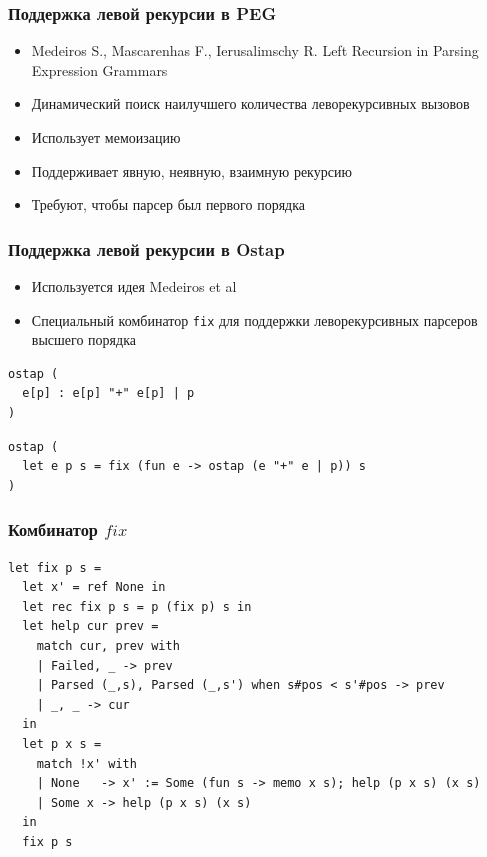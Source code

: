 \documentclass{beamer}
\begin{document}
\begin{frame}
  \transwipe[direction=90]
  \frametitle{Поддержка левой рекурсии в PEG}
  \begin{itemize}
    \item Medeiros S., Mascarenhas F., Ierusalimschy R. Left Recursion in Parsing Expression Grammars 
    \item Динамический поиск наилучшего количества леворекурсивных вызовов
    \item Использует мемоизацию
    \item Поддерживает явную, неявную, взаимную рекурсию
    \item Требуют, чтобы парсер был первого порядка
  \end{itemize}
\end{frame}

\begin{frame}[fragile]
  \transwipe[direction=90]
  \frametitle{Поддержка левой рекурсии в Ostap}
  \begin{itemize} 
    \item Используется идея Medeiros et al
    \item Специальный комбинатор \verb!fix! для поддержки леворекурсивных парсеров высшего порядка
  \end{itemize}
\begin{lstlisting}[frame=single]  
ostap (
  e[p] : e[p] "+" e[p] | p
)
\end{lstlisting}

\begin{lstlisting}[frame=single]  
ostap (
  let e p s = fix (fun e -> ostap (e "+" e | p)) s
)
\end{lstlisting}
\end{frame}


\begin{frame}[fragile]
  \transwipe[direction=90]
  \frametitle{Комбинатор $fix$}

\begin{lstlisting}[frame=single]  
let fix p s = 
  let x' = ref None in  
  let rec fix p s = p (fix p) s in
  let help cur prev =
    match cur, prev with 
    | Failed, _ -> prev
    | Parsed (_,s), Parsed (_,s') when s#pos < s'#pos -> prev
    | _, _ -> cur
  in
  let p x s = 
    match !x' with
    | None   -> x' := Some (fun s -> memo x s); help (p x s) (x s)
    | Some x -> help (p x s) (x s)
  in
  fix p s
\end{lstlisting}
\end{frame}
\end{document}
